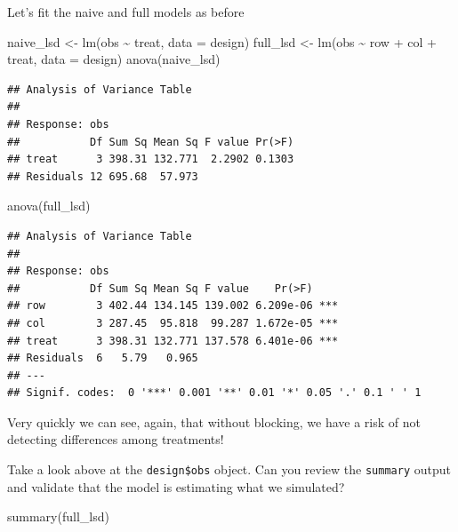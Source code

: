 \documentclass[
]{book}
\newenvironment{Shaded}{\begin{snugshade}}{\end{snugshade}}
\newcommand{\AttributeTok}[1]{\textcolor[rgb]{0.77,0.63,0.00}{#1}}
\newcommand{\FunctionTok}[1]{\textcolor[rgb]{0.00,0.00,0.00}{#1}}
\newcommand{\NormalTok}[1]{#1}
\newcommand{\OtherTok}[1]{\textcolor[rgb]{0.56,0.35,0.01}{#1}}
\newcommand{\SpecialCharTok}[1]{\textcolor[rgb]{0.00,0.00,0.00}{#1}}
\begin{document}
Let's fit the naive and full models as before

\begin{Shaded}
\begin{Highlighting}[]
\NormalTok{naive\_lsd }\OtherTok{\textless{}{-}} \FunctionTok{lm}\NormalTok{(obs }\SpecialCharTok{\textasciitilde{}}\NormalTok{ treat, }\AttributeTok{data =}\NormalTok{ design)}
\NormalTok{full\_lsd }\OtherTok{\textless{}{-}} \FunctionTok{lm}\NormalTok{(obs }\SpecialCharTok{\textasciitilde{}}\NormalTok{ row }\SpecialCharTok{+}\NormalTok{ col }\SpecialCharTok{+}\NormalTok{ treat, }\AttributeTok{data =}\NormalTok{ design)}
\FunctionTok{anova}\NormalTok{(naive\_lsd)}
\end{Highlighting}
\end{Shaded}

\begin{verbatim}
## Analysis of Variance Table
## 
## Response: obs
##           Df Sum Sq Mean Sq F value Pr(>F)
## treat      3 398.31 132.771  2.2902 0.1303
## Residuals 12 695.68  57.973
\end{verbatim}

\begin{Shaded}
\begin{Highlighting}[]
\FunctionTok{anova}\NormalTok{(full\_lsd)}
\end{Highlighting}
\end{Shaded}

\begin{verbatim}
## Analysis of Variance Table
## 
## Response: obs
##           Df Sum Sq Mean Sq F value    Pr(>F)    
## row        3 402.44 134.145 139.002 6.209e-06 ***
## col        3 287.45  95.818  99.287 1.672e-05 ***
## treat      3 398.31 132.771 137.578 6.401e-06 ***
## Residuals  6   5.79   0.965                      
## ---
## Signif. codes:  0 '***' 0.001 '**' 0.01 '*' 0.05 '.' 0.1 ' ' 1
\end{verbatim}

Very quickly we can see, again, that without blocking, we have a risk of not detecting differences among treatments!

Take a look above at the \texttt{design\$obs} object. Can you review the \texttt{summary} output and validate that the model is estimating what we simulated?

\begin{Shaded}
\begin{Highlighting}[]
\FunctionTok{summary}\NormalTok{(full\_lsd)}
\end{Highlighting}
\end{Shaded}
\end{document}
